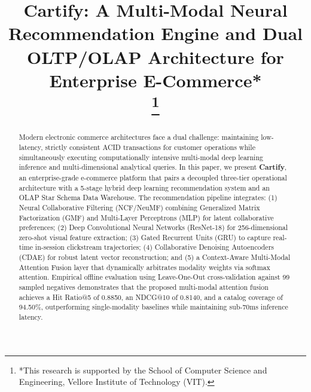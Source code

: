 \documentclass[conference]{IEEEtran}
\begin{document}
\title{Cartify: A Multi-Modal Neural Recommendation Engine and Dual OLTP/OLAP Architecture for Enterprise E-Commerce*\\
\thanks{*This research is supported by the School of Computer Science and Engineering, Vellore Institute of Technology (VIT).}
}

\author{
\and
{}
\and
{}
}

\maketitle

\begin{abstract}
Modern electronic commerce architectures face a dual challenge: maintaining low-latency, strictly consistent ACID transactions for customer operations while simultaneously executing computationally intensive multi-modal deep learning inference and multi-dimensional analytical queries. In this paper, we present \textbf{Cartify}, an enterprise-grade e-commerce platform that pairs a decoupled three-tier operational architecture with a 5-stage hybrid deep learning recommendation system and an OLAP Star Schema Data Warehouse. The recommendation pipeline integrates: (1) Neural Collaborative Filtering (NCF/NeuMF) combining Generalized Matrix Factorization (GMF) and Multi-Layer Perceptrons (MLP) for latent collaborative preferences; (2) Deep Convolutional Neural Networks (ResNet-18) for 256-dimensional zero-shot visual feature extraction; (3) Gated Recurrent Units (GRU) to capture real-time in-session clickstream trajectories; (4) Collaborative Denoising Autoencoders (CDAE) for robust latent vector reconstruction; and (5) a Context-Aware Multi-Modal Attention Fusion layer that dynamically arbitrates modality weights via softmax attention. Empirical offline evaluation using Leave-One-Out cross-validation against 99 sampled negatives demonstrates that the proposed multi-modal attention fusion achieves a Hit Ratio@5 of 0.8850, an NDCG@10 of 0.8140, and a catalog coverage of 94.50\%, outperforming single-modality baselines while maintaining sub-70ms inference latency.
\end{abstract}
\end{document}
